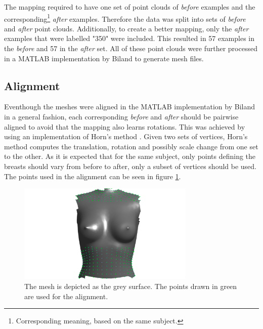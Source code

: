 The mapping required to have one set of point clouds of \textit{before} examples and the corresponding\footnote{Corresponding meaning, based on the same subject.} \textit{after} examples. Therefore the data was split into sets of \textit{before} and \textit{after} point clouds. Additionally, to create a better mapping, only the \textit{after} examples that were labelled "350" were included. This resulted in 57 examples in the \textit{before} and 57 in the \textit{after} set. All of these point clouds were further processed in a MATLAB implementation by Biland \cite{Biland17} to generate mesh files.


\subsection{Alignment}
\label{align}
Eventhough the meshes were aligned in the MATLAB implementation by Biland \cite{Biland17} in a general fashion, each corresponding \textit{before} and \textit{after} should be pairwise aligned to avoid that the mapping also learns rotations. This was achieved by using an implementation of Horn's method \cite{horn1987closed}. Given two sets of vertices, Horn's method computes the translation, rotation and possibly scale change from one set to the other. As it is expected that for the same subject, only points defining the breasts should vary from before to after, only a subset of vertices should be used. The points used in the alignment can be seen in figure \ref{fig:alignment}.

\begin{figure}[h]
\centering
\includegraphics[width=0.75\textwidth]{figures/alignment}
\caption{The mesh is depicted as the grey surface. The points drawn in green are used for the alignment.}
\label{fig:alignment}
\end{figure}

